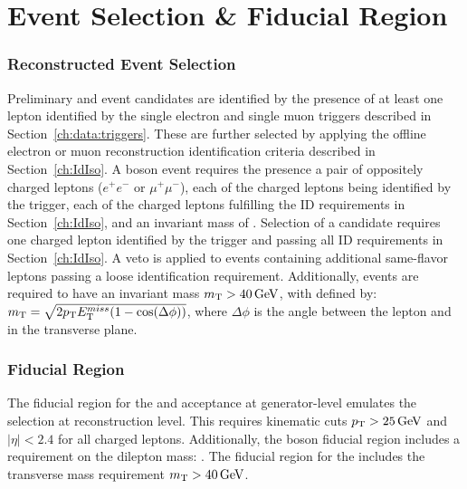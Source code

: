 




\section{Event Selection \& Fiducial Region}
 \subsubsection{Reconstructed Event Selection}
Preliminary \Wpm and \Z event candidates are identified by the presence of at least one lepton identified by the single electron and single muon triggers described in Section~\ref{ch:data:triggers}. These are further selected by applying the offline electron or muon reconstruction identification criteria described in Section~\ref{ch:IdIso}. 
A \Z boson event requires the presence a pair of oppositely charged leptons ($e^{+}e^{-}$ or $\mu^{+}\mu^{-}$), each of the charged leptons being identified by the trigger, each of the charged leptons fulfilling the ID requirements in Section~\ref{ch:IdIso}, and an invariant mass of \masswindow. 
Selection of a \Wpm candidate requires one charged lepton identified by the trigger and passing all ID requirements in Section~\ref{ch:IdIso}. A veto is applied to events containing additional same-flavor leptons passing a loose identification requirement. Additionally, \Wpm events are required to have an invariant mass $m_{\mathrm{T}} > 40\,\text{Ge\hspace{-.08em}V}$, with \mt defined by: 
$m_{\mathrm{T}} = \sqrt{ 2 p_{\mathrm{T}} E_{\mathrm{T}}^{miss} ( 1 - \cos(\Delta\phi) ) }$, where $\Delta\phi$ is the angle between the lepton and \vmet in the transverse plane.

\subsubsection{Fiducial Region}
The fiducial region for the \Wpm and \Z acceptance at generator-level emulates the selection at reconstruction level. This requires kinematic cuts $p_{\mathrm{T}} > 25 \,\text{Ge\hspace{-.08em}V}$ and $|\eta| < 2.4$ for all charged leptons. Additionally, the \Z boson fiducial region includes a requirement on the dilepton mass: \masswindow. The fiducial region for the \Wpm includes the transverse mass requirement $m_{\mathrm{T}}>40\,\text{Ge\hspace{-.08em}V}$.


